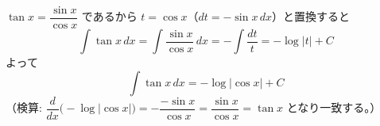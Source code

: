 
$\tan x = \dfrac{\sin x}{\cos x}$ であるから $t = \cos x$（$dt = -\sin x \, dx$）と置換すると
\[
\int \tan x \, dx = \int \frac{\sin x}{\cos x}\, dx = -\int \frac{dt}{t} = -\log|t| + C
\]
よって
\[
\boxed{\; \int \tan x \, dx = -\log|\cos x| + C \;}
\]
（検算: $\dfrac{d}{dx}\bigl(-\log|\cos x|\bigr) = -\dfrac{-\sin x}{\cos x} = \dfrac{\sin x}{\cos x} = \tan x$ となり一致する。）
